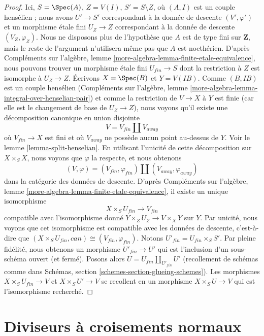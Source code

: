 \begin{proof}
\medskip\noindent
Ici, $S = \Spec(A)$, $Z = V(I)$, $S' = S \setminus Z$, où
$(A, I)$ est un couple hensélien ; nous avons $U' \to S'$ correspondant
à la donnée de descente $(V', \varphi')$ et un morphisme \'etale fini
$U_Z \to Z$ correspondant à la donnée de descente
$(V_Z, \varphi_Z)$. Nous ne disposons plus de l'hypothèse que $A$ est de type fini
sur $\mathbf{Z}$, mais le reste de l'argument n'utilisera même pas
que $A$ est noethérien.
D'après Compléments sur l'algèbre, lemme \ref{more-algebra-lemma-finite-etale-equivalence},
nous pouvons trouver un morphisme \'etale fini $U_{fin} \to S$ dont la
restriction à $Z$ est isomorphe à $U_Z \to Z$.
Écrivons $X = \Spec(B)$ et $Y = V(IB)$. Comme $(B, IB)$ est un couple hensélien
(Compléments sur l'algèbre, lemme \ref{more-algebra-lemma-integral-over-henselian-pair})
et comme la restriction de $V \to X$ à $Y$
est finie (car elle est le changement de base de $U_Z \to Z$), nous voyons
qu'il existe une décomposition canonique en union disjointe
$$
V = V_{fin} \amalg V_{away}
$$
où $V_{fin} \to X$ est fini et où $V_{away}$ ne possède aucun
point au-dessus de $Y$. Voir le lemme \ref{lemma-split-henselian}.
En utilisant l'unicité de cette décomposition sur $X \times_S X$,
nous voyons que $\varphi$ la respecte, et nous obtenons
$$
(V, \varphi) = (V_{fin}, \varphi_{fin}) \amalg (V_{away}, \varphi_{away})
$$
dans la catégorie des données de descente.
D'après Compléments sur l'algèbre, lemme \ref{more-algebra-lemma-finite-etale-equivalence},
il existe un unique isomorphisme
$$
X \times_S U_{fin} \longrightarrow V_{fin}
$$
compatible avec l'isomorphisme donné $Y \times_Z U_Z \to V \times_X Y$
sur $Y$.
Par unicité, nous voyons que cet isomorphisme est compatible
avec les données de descente, c'est-à-dire que
$(X \times_S U_{fin}, can) \cong (V_{fin}, \varphi_{fin})$.
Notons $U'_{fin} = U_{fin} \times_S S'$. Par pleine fidélité,
nous obtenons un morphisme $U'_{fin} \to U'$ qui est
l'inclusion d'un sous-schéma ouvert (et fermé).
Posons alors $U = U_{fin} \amalg_{U'_{fin}} U'$ (recollement de schémas comme
dans Schémas, section \ref{schemes-section-glueing-schemes}).
Les morphismes $X \times_S U_{fin} \to V$ et
$X \times_S U' \to V$ se recollent en un morphisme $X \times_S U \to V$
qui est l'isomorphisme recherché.
\end{proof}





\section{Diviseurs à croisements normaux}
\label{section-normal-crossings}

